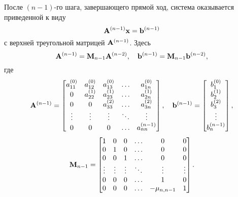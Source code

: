 \documentclass[12pt]{article}
\begin{document}
    После $\left(n-1\right)$-го шага, завершающего прямой ход, система оказывается приведенной к виду
    \begin{equation}
        \bold{A}^{\left(n-1\right)}\bold{x}=\bold{b}^{\left(n-1\right)}
    \end{equation}
    с верхней треугольной матрицей $\bold{A}^{\left(n-1\right)}$. Здесь
    \begin{equation}
        \bold{A}^{\left(n-1\right)}=\bold{M}_{n-1}\bold{A}^{\left(n-2\right)},\quad \bold{b}^{\left(n-1\right)}=\bold{M}_{n-1}\bold{b}^{\left(n-2\right)},
    \end{equation}
    где
        \begin{equation}
        \bold{A}^{\left(n-1\right)}=
        \begin{bmatrix}
        a_{11}^{\left(0\right)}       & a_{12}^{\left(0\right)} & a_{13}^{\left(0\right)} & \ldots                  & a_{1n}^{\left(0\right)} \\
        0                             & a_{22}^{\left(1\right)}   & a_{23}^{\left(1\right)} & \ldots                  & a_{2n}^{\left(1\right)} \\
        0                             & 0 & a_{33}^{\left(2\right)} & \ldots                  & a_{3n}^{\left(2\right)} \\
        \vdots                        & \vdots                  & \vdots                  & \ddots                  & \vdots \\
        0 & 0   & 0 & \ldots                  & a_{nn}^{\left(n-1\right)}
        \end{bmatrix},\quad
        \bold{b}^{\left(n-1\right)}=
        \begin{bmatrix}
            b_1^{\left(0\right)} \\
            b_2^{\left(1\right)} \\
            b_3^{\left(2\right)} \\
            \vdots \\
            b_n^{{\left(n-1\right)}}
        \end{bmatrix},
    \end{equation}
    \begin{equation}
        \bold{M}_{n-1}=
        \begin{bmatrix}
            1 & 0 & 0 & \ldots & 0 & 0 \\
            0 & 1 & 0 & \ldots & 0 & 0 \\
            0 & 0 & 1 & \ldots & 0 & 0 \\
             \vdots & \vdots & \vdots & \ddots & \vdots &  \vdots \\
             0 & 0 & 0 & \ldots & 1 & 0 \\
             0 & 0 & 0 & \ldots & -\mu_{n,n-1} & 1
        \end{bmatrix}.
    \end{equation}
\end{document}
